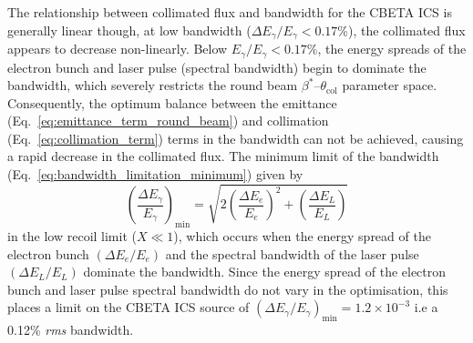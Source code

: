 \documentclass[../main.tex]{subfiles}
\begin{document}
The relationship between collimated flux and bandwidth for the CBETA ICS is generally linear though, at low bandwidth ($\Delta E_{\gamma}/E_{\gamma}<0.17$\%), the collimated flux appears to decrease non-linearly. Below $E_{\gamma}/E_{\gamma}<0.17$\%, the energy spreads of the electron bunch and laser pulse (spectral bandwidth) begin to dominate the bandwidth, which severely restricts the round beam $\beta^{*}$--$\theta_{\mathrm{col}}$ parameter space. Consequently, the optimum balance between the emittance (Eq.~\ref{eq:emittance_term_round_beam}) and collimation (Eq.~\ref{eq:collimation_term}) terms in the bandwidth can not be achieved, causing a rapid decrease in the collimated flux. The minimum limit of the bandwidth (Eq.~\ref{eq:bandwidth_limitation_minimum}) given by
\begin{equation*}
\left(\frac{\Delta E_{\gamma}}{E_{\gamma}}\right)_{\mathrm{min}} = \sqrt{2\left(\frac{\Delta E_{e}}{E_{e}}\right)^{2}+\left(\frac{\Delta E_{L}}{E_{L}}\right)}   
\end{equation*}
in the low recoil limit ($X \ll 1$), which occurs when the energy spread of the electron bunch $\left(\Delta E_{e}/E_{e}\right)$ and the spectral bandwidth of the laser pulse $\left(\Delta E_{L}/E_{L}\right)$ dominate the bandwidth. Since the energy spread of the electron bunch and laser pulse spectral bandwidth do not vary in the optimisation, this places a limit on the CBETA ICS source of $\left(\Delta E_{\gamma}/E_{\gamma}\right)_{\mathrm{min}}=1.2\times 10^{-3}$ i.e a 0.12\% \textit{rms} bandwidth.
\end{document}

